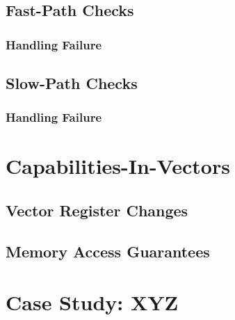 \subsection{Fast-Path Checks}
\subsubsection{Handling Failure}
\subsection{Slow-Path Checks}
\subsubsection{Handling Failure}

\section{Capabilities-In-Vectors}
\subsection{Vector Register Changes}
\subsection{Memory Access Guarantees}

\section{Case Study: XYZ}